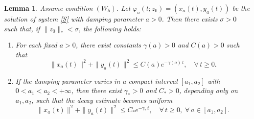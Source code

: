 \documentclass[12pt]{amsart}
\numberwithin{equation}{section}
\newtheorem{lemma}[theorem]{Lemma}
\begin{document}
\begin{lemma}\label{L7}
	Assume condition \hyperlink{W5}{$(W_5)$}. Let $\varphi_a(t;z_0)=(x_a(t),y_a(t))$ be the solution of system \eqref{S} with damping parameter $a>0$. Then there exists $\sigma>0$ such that, if $\|z_0\|_*<\sigma$, the following holds:
	\begin{enumerate}
		\item[\emph{(i)}] For each fixed $a>0$, there exist constants $\gamma(a)>0$ and $C(a)>0$ such that
		$$
		\|x_a(t)\|^2+\|y_a(t)\|^2 \le C(a) e^{-\gamma(a)\,t},\quad \forall\, t\ge0.
		$$
		\item[\emph{(ii)}] If the damping parameter varies in a compact interval 
		$[a_1,a_2]$ with $0<a_1<a_2<+\infty$, then there exist $\gamma_*>0$ and $C_*>0$, depending only on $a_1,a_2$, such that the decay estimate becomes uniform
		$$
		\|x_a(t)\|^2+\|y_a(t)\|^2 \le  C_* e^{-\gamma_*\, t},\quad \forall\, t\ge0, \;\forall\, a\in[a_1,a_2].
		$$
	\end{enumerate}
\end{lemma}
\end{document}
